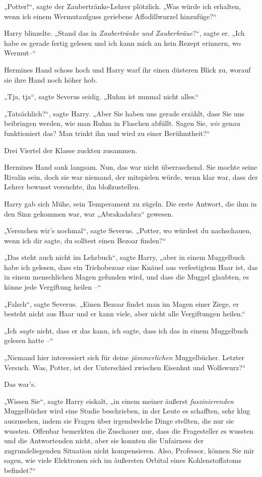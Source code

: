 {„Potter!“, sagte der Zaubertränke-Lehrer plötzlich. „Was würde ich erhalten, wenn ich einem Wermutaufguss geriebene Affodillwurzel hinzufüge?“

Harry blinzelte. „Stand das in \emph{Zaubertränke und Zauberbräue}?“, sagte er. „Ich habe es gerade fertig gelesen und ich kann mich an kein Rezept erinnern, wo Wermut--“

Hermines Hand schoss hoch und Harry warf ihr einen düsteren Blick zu, worauf sie ihre Hand noch höher hob.

„Tja, tja“, sagte Severus seidig. „Ruhm ist nunmal nicht alles.“

„Tatsächlich?“, sagte Harry. „Aber Sie haben uns gerade erzählt, dass Sie uns beibringen werden, wie man Ruhm in Flaschen abfüllt. Sagen Sie, \emph{wie} genau funktioniert das? Man trinkt ihn und wird zu einer Berühmtheit?“

Drei Viertel der Klasse zuckten zusammen.

Hermines Hand sank langsam. Nun, das war nicht überraschend. Sie mochte seine Rivalin sein, doch sie war niemand, der mitspielen würde, wenn klar war, dass der Lehrer bewusst versuchte, ihn bloßzustellen.

Harry gab sich Mühe, sein Temperament zu zügeln. Die erste Antwort, die ihm in den Sinn gekommen war, war „Abrakadabra“ gewesen.

„Versuchen wir's nochmal“, sagte Severus. „Potter, wo würdest du nachschauen, wenn ich dir sagte, du solltest einen Bezoar finden?“

„Das steht auch nicht im Lehrbuch“, sagte Harry, „aber in einem Muggelbuch habe ich gelesen, dass ein Trichobezoar eine Knäuel aus verfestigtem Haar ist, das in einem menschlichen Magen gefunden wird, und dass die Muggel glaubten, es könne jede Vergiftung heilen --“

„Falsch“, sagte Severus. „Einen Bezoar findet man im Magen einer Ziege, er besteht nicht aus Haar und er kann viele, aber nicht alle Vergiftungen heilen.“

„Ich \emph{sagte} nicht, dass er das kann, ich sagte, dass ich das in einem Muggelbuch gelesen hatte --“

„Niemand hier interessiert sich für deine \emph{jämmerlichen} Muggelbücher. Letzter Versuch. Was, Potter, ist der Unterschied zwischen Eisenhut und Wolfswurz?“

Das war's.

„Wissen Sie“, sagte Harry eiskalt, „in einem meiner äußerst \emph{faszinierenden} Muggelbücher wird eine Studie beschrieben, in der Leute es schafften, sehr klug auszusehen, indem sie Fragen über irgendwelche Dinge stellten, die nur sie wussten. Offenbar bemerkten die Zuschauer nur, dass die Fragesteller es wussten und die Antwortenden nicht, aber sie konnten die Unfairness der zugrundeliegenden Situation nicht kompensieren. Also, Professor, können Sie mir sagen, wie viele Elektronen sich im äußersten Orbital eines Kohlenstoffatoms befindet?“

}

